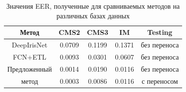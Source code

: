 \begin{table}
	\begin{center}
		\begin{tabular}{|c|c|c|c|c|}
			\hline
			Метод							&CMS2		&CMS3		&IM				&Testing		\\
			\hline
			DeepIrisNet						&0.0709		&0.1199		&0.1371			&без переноса  		\\
			FCN+ETL							&0.0093		&0.0301		&0.0607			&без переноса		\\
			Предложенный					&0.0014		&0.0190		&0.0116			&без переноса		\\
			метод							&0.0003		&0.0086		&0.0116			&с переносом		\\\hline
		\end{tabular}
		\caption{Значения EER, полученные для сравниваемых методов на различных базах данных}
		\label{tab:exp-results-comp}
	\end{center}
\end{table}

